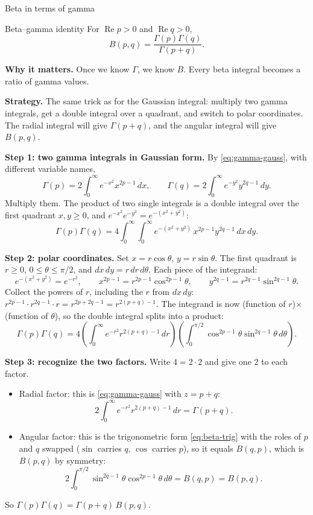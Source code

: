 \documentclass[11pt]{beamer}
\begin{document}
\begin{frame}[allowframebreaks=1.00]{Beta in terms of gamma}
\footnotesize

\begin{block}{Beta--gamma identity}
For \(\operatorname{Re}p>0\) and \(\operatorname{Re}q>0\),
\[
  B(p,q)=\frac{\Gamma(p)\Gamma(q)}{\Gamma(p+q)}.
\]
\end{block}
\textbf{Why it matters.} Once we know \(\Gamma\), we know \(B\). Every beta integral becomes a
ratio of gamma values.

\textbf{Strategy.} The same trick as for the Gaussian integral: multiply two gamma integrals,
get a double integral over a quadrant, and switch to polar coordinates. The radial integral will
give \(\Gamma(p+q)\), and the angular integral will give \(B(p,q)\).

\textbf{Step 1: two gamma integrals in Gaussian form.} By \eqref{eq:gamma-gauss}, with
different variable names,
\[
  \Gamma(p)=2\int_0^\infty e^{-x^2}x^{2p-1}\,dx,
  \qquad
  \Gamma(q)=2\int_0^\infty e^{-y^2}y^{2q-1}\,dy.
\]
Multiply them. The product of two single integrals is a double integral over the first quadrant
\(x,y\ge0\), and \(e^{-x^2}e^{-y^2}=e^{-(x^2+y^2)}\):
\[
  \Gamma(p)\Gamma(q)
   =4\int_0^\infty\!\!\int_0^\infty
     e^{-(x^2+y^2)}\,
     x^{2p-1}y^{2q-1}\,dx\,dy.
\]
\par\framebreak\par
\textbf{Step 2: polar coordinates.} Set \(x=r\cos\theta\), \(y=r\sin\theta\). The first quadrant
is \(r\ge0\), \(0\le\theta\le\pi/2\), and \(dx\,dy=r\,dr\,d\theta\). Each piece of the integrand:
\[
 e^{-(x^2+y^2)}=e^{-r^2},\qquad
 x^{2p-1}=r^{2p-1}\cos^{2p-1}\theta,\qquad
 y^{2q-1}=r^{2q-1}\sin^{2q-1}\theta .
\]
Collect the powers of \(r\), including the \(r\) from \(dx\,dy\):
\(r^{2p-1}\cdot r^{2q-1}\cdot r=r^{2p+2q-1}=r^{2(p+q)-1}\). The integrand is now (function of
\(r\))\(\times\)(function of \(\theta\)), so the double integral splits into a product:
\[
 \Gamma(p)\Gamma(q)
 =4\left(\int_0^\infty e^{-r^2}r^{2(p+q)-1}\,dr\right)
   \left(\int_0^{\pi/2}\cos^{2p-1}\theta\sin^{2q-1}\theta\,d\theta\right).
\]
\par\framebreak\par
\textbf{Step 3: recognize the two factors.} Write \(4=2\cdot2\) and give one \(2\) to each factor.
\begin{itemize}
  \item Radial factor: this is \eqref{eq:gamma-gauss} with \(z=p+q\):
        \[
          2\int_0^\infty e^{-r^2}r^{2(p+q)-1}\,dr=\Gamma(p+q).
        \]
  \item Angular factor: this is the trigonometric form \eqref{eq:beta-trig} with the roles of
        \(p\) and \(q\) swapped (\(\sin\) carries \(q\), \(\cos\) carries \(p\)), so it equals \(B(q,p)\),
        which is \(B(p,q)\) by symmetry:
        \[
          2\int_0^{\pi/2}\sin^{2q-1}\theta\cos^{2p-1}\theta\,d\theta=B(q,p)=B(p,q).
        \]
\end{itemize}
So \(\Gamma(p)\Gamma(q)=\Gamma(p+q)\,B(p,q)\).


\end{frame}
\end{document}
